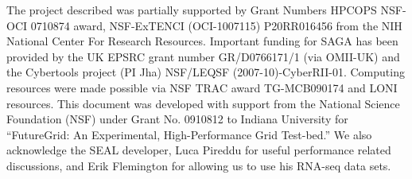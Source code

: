 \documentclass{acm_proc_article-sp}
\begin{document}
The project described was partially supported by Grant Numbers HPCOPS
NSF-OCI 0710874 award, NSF-ExTENCI (OCI-1007115) P20RR016456 from the
NIH National Center For Research Resources.  Important funding for
SAGA has been provided by the UK EPSRC grant number GR/D0766171/1 (via
OMII-UK) and the Cybertools project (PI Jha) NSF/LEQSF
(2007-10)-CyberRII-01.  Computing resources were made possible via NSF
TRAC award TG-MCB090174 and LONI resources.  This document was
developed with support from the National Science Foundation (NSF)
under Grant No.  0910812 to Indiana University for ``FutureGrid: An
Experimental, High-Performance Grid Test-bed.''  We also acknowledge
the SEAL developer, Luca Pireddu for useful performance related
discussions, and Erik Flemington for allowing us to use his RNA-seq
data sets.



\end{document}
